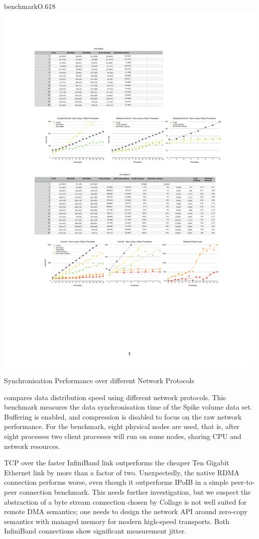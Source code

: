 \begin{wrapfloat}{benchmark}{O}{.618\textwidth}
  \includegraphics[width=.618\textwidth]{results/network}
  {\caption{\label{rNetwork}Synchronisation Performance over different Network Protocols}}
\end{wrapfloat}

 compares data distribution speed using different network
protocols. This benchmark measures the data synchronisation time of the Spike volume
data set. Buffering is enabled, and compression is disabled to
focus on the raw network performance. For the benchmark, eight physical nodes
are used, that is, after eight processes two client processes will run on some
nodes, sharing CPU and network resources.

TCP over the faster InfiniBand link outperforms the cheaper Ten Gigabit
Ethernet link by more than a factor of two. Unexpectedly, the native RDMA
connection performs worse, even though it outperforms IPoIB in a simple
peer-to-peer connection benchmark. This needs further investigation, but we
suspect the abstraction of a byte stream connection chosen by Collage is not
well suited for remote DMA semantics; one needs to design the network
API around zero-copy semantics with managed memory for modern high-speed
transports. Both InfiniBand connections show significant measurement jitter.

